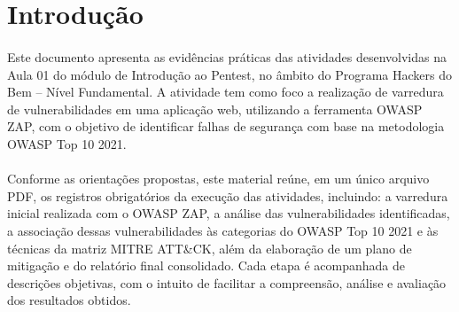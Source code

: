 \section{Introdução}

\paragraph{}
Este documento apresenta as evidências práticas das atividades desenvolvidas na
Aula 01 do módulo de Introdução ao Pentest, no âmbito do Programa Hackers do
Bem -- Nível Fundamental. A atividade tem como foco a realização de varredura
de vulnerabilidades em uma aplicação web, utilizando a ferramenta OWASP ZAP,
com o objetivo de identificar falhas de segurança com base na metodologia OWASP
Top 10 2021.

\paragraph{}
Conforme as orientações propostas, este material reúne, em um único arquivo
PDF, os registros obrigatórios da execução das atividades, incluindo: a
varredura inicial realizada com o OWASP ZAP, a análise das vulnerabilidades
identificadas, a associação dessas vulnerabilidades às categorias do OWASP Top
10 2021 e às técnicas da matriz MITRE ATT\&CK, além da elaboração de um plano
de mitigação e do relatório final consolidado. Cada etapa é acompanhada de
descrições objetivas, com o intuito de facilitar a compreensão, análise e
avaliação dos resultados obtidos.
